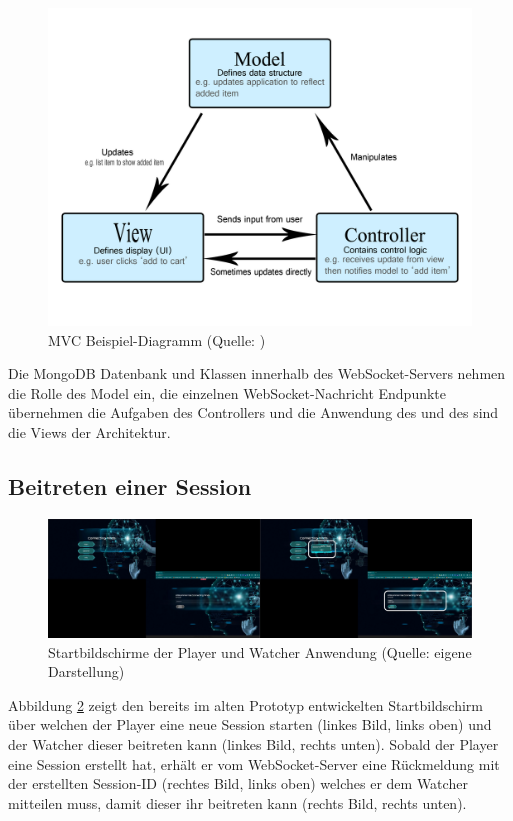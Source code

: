 \begin{figure}[ht]
\centering
\includegraphics[width=1\linewidth]{content/pictures/mvc-architecture.png}
\caption{\ac{MVC} Beispiel-Diagramm (Quelle: \cite{noauthor_mvc_2023})}
\label{fig:mvc-diagramm}
\end{figure}

Die MongoDB Datenbank und Klassen innerhalb des WebSocket-Servers nehmen die Rolle des Model ein, die einzelnen WebSocket-Nachricht Endpunkte übernehmen die Aufgaben des Controllers und die Anwendung des  und des  sind die Views der Architektur.

\subsection{Beitreten einer Session}

\begin{figure}[ht]
\centering
\includegraphics[width=1\linewidth]{content/pictures/Login_Login_by_ID.png}
\caption{Startbildschirme der Player und Watcher Anwendung (Quelle: eigene Darstellung)}
\label{fig:old-logins}
\end{figure}

Abbildung \ref{fig:old-logins} zeigt den bereits im alten Prototyp entwickelten Startbildschirm über welchen der Player eine neue Session starten (linkes Bild, links oben) und der Watcher dieser beitreten kann (linkes Bild, rechts unten). Sobald der Player eine Session erstellt hat, erhält er vom WebSocket-Server eine Rückmeldung mit der erstellten Session-ID (rechtes Bild, links oben) welches er dem Watcher mitteilen muss, damit dieser ihr beitreten kann (rechts Bild, rechts unten).

